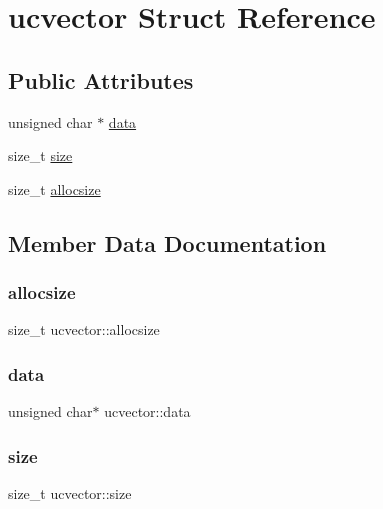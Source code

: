 \hypertarget{structucvector}{}\section{ucvector Struct Reference}
\label{structucvector}
\subsection*{Public Attributes}
\begin{DoxyCompactItemize}
\item 
unsigned char $\ast$ \mbox{\hyperlink{structucvector_ace794c5713208c5a20f21762cd87c919}{data}}
\item 
size\+\_\+t \mbox{\hyperlink{structucvector_a27c99c34de0c5b3ca0c242d402c69499}{size}}
\item 
size\+\_\+t \mbox{\hyperlink{structucvector_a235168baac13f0c78bd3e309dc170f90}{allocsize}}
\end{DoxyCompactItemize}


\subsection{Member Data Documentation}
\mbox{\label{structucvector_a235168baac13f0c78bd3e309dc170f90}} 
\subsubsection{\texorpdfstring{allocsize}{allocsize}}
{\footnotesize\ttfamily size\+\_\+t ucvector\+::allocsize}

\mbox{\label{structucvector_ace794c5713208c5a20f21762cd87c919}} 
\subsubsection{\texorpdfstring{data}{data}}
{\footnotesize\ttfamily unsigned char$\ast$ ucvector\+::data}

\mbox{\label{structucvector_a27c99c34de0c5b3ca0c242d402c69499}} 
\subsubsection{\texorpdfstring{size}{size}}
{\footnotesize\ttfamily size\+\_\+t ucvector\+::size}

